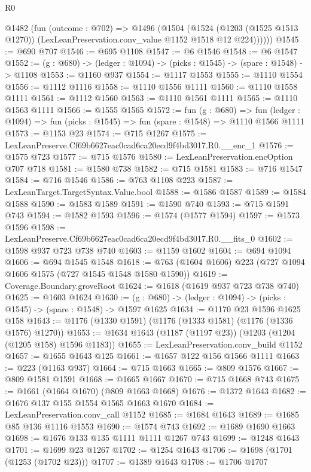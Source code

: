 \begin{lexlean}{R0}
\begin{coremodule}
      @1482
        (fun (outcome : @702) =>
        @1496
          (@1504
            (@1524
              (@1203 (@1525 @1513 @1270))
              (LexLeanPreservation.conv_value @1152 @1518 @12 @224))))))
@1545 := @690 @707
@1546 := @695 @1108
@1547 := @6 @1546
@1548 := @6 @1547
@1552 := (g : @680) -> (ledger : @1094) -> (picks : @1545) -> (spare : @1548) -> @1108
@1553 := @1160 @937
@1554 := @1117 @1553
@1555 := @1110 @1554
@1556 := @1112 @1116
@1558 := @1110 @1556 @1111
@1560 := @1110 @1558 @1111
@1561 := @1112 @1560
@1563 := @1110 @1561 @1111
@1565 := @1110 @1563 @1111
@1566 := @1555 @1565
@1572 := fun (g : @680) =>
  fun (ledger : @1094) => fun (picks : @1545) => fun (spare : @1548) => @1110 @1566 @1111
@1573 := @1153 @23
@1574 := @715 @1267
@1575 := LexLeanPreserve.Cf69b6627eac0cad6ca20ecd9f4bd3017.R0.__enc_1
@1576 := @1575 @723
@1577 := @715 @1576
@1580 := LexLeanPreservation.encOption @707 @718
@1581 := @1580 @738
@1582 := @715 @1581
@1583 := @716 @1547
@1584 := @716 @1546
@1586 := @763 @1108 @223
@1587 := LexLeanTarget.TargetSyntax.Value.bool
@1588 := @1586 @1587
@1589 := @1584 @1588
@1590 := @1583 @1589
@1591 := @1590 @740
@1593 := @715 @1591 @743
@1594 := @1582 @1593
@1596 := @1574 (@1577 @1594)
@1597 := @1573 @1596
@1598 := LexLeanPreserve.Cf69b6627eac0cad6ca20ecd9f4bd3017.R0.__fits_0
@1602 := @1598 @937 @723 @738 @740
@1603 := @1159 @1602
@1604 := @694 @1094
@1606 := @694 @1545 @1548
@1618 := @763 (@1604 @1606) @223 (@727 @1094 @1606 @1575 (@727 @1545 @1548 @1580 @1590))
@1619 := Coverage.Boundary.groveRoot
@1624 := @1618 (@1619 @937 @723 @738 @740)
@1625 := @1603 @1624
@1630 := (g : @680) -> (ledger : @1094) -> (picks : @1545) -> (spare : @1548) -> @1597 @1625
@1634 := @1170 @23 @1596 @1625 @158
@1643 := @1176 (@1330 @1591) (@1176 (@1333 @1581) (@1176 (@1336 @1576) @1270))
@1653 := @1634 @1643 (@1187 (@1197 @23)) (@1203 (@1204 (@1205 @158) @1596 @1183))
@1655 := LexLeanPreservation.conv_build @1152
@1657 := @1655 @1643 @125
@1661 := @1657 @122 @156 @1566 @1111
@1663 := @223 (@1163 @937)
@1664 := @715 @1663
@1665 := @809 @1576
@1667 := @809 @1581 @1591
@1668 := @1665 @1667
@1670 := @715 @1668 @743
@1675 := @1661 (@1664 @1670) (@809 @1663 @1668)
@1676 := @1372 @1643
@1682 := @1676 @137 @155 @1554 @1565 @1663 @1670
@1684 := LexLeanPreservation.conv_call @1152
@1685 := @1684 @1643
@1689 := @1685 @85 @136 @1116 @1553
@1690 := @1574 @743
@1692 := @1689 @1690 @1663
@1698 := @1676 @133 @135 @1111 @1111 @1267 @743
@1699 := @1248 @1643
@1701 := @1699 @23 @1267
@1702 := @1254 @1643
@1706 := @1698 (@1701 (@1253 (@1702 @23)))
@1707 := @1389 @1643
@1708 := @1706 @1707

\end{coremodule}
\end{lexlean}
